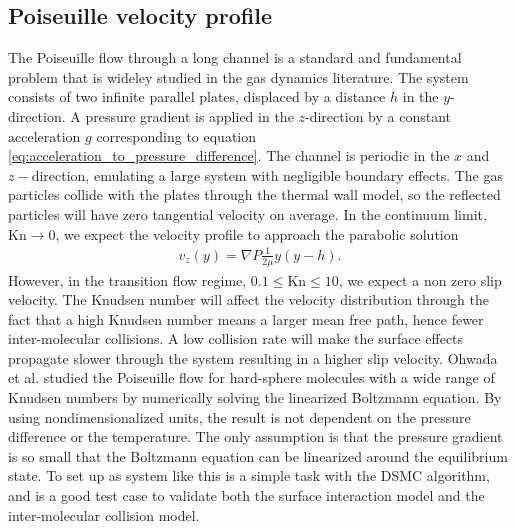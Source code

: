 \subsection{Poiseuille velocity profile}
\label{sec:dsmc_validation_poiseuille}
The Poiseuille flow through a long channel is a standard and fundamental problem that is wideley studied in the gas dynamics literature. The system consists of two infinite parallel plates, displaced by a distance $h$ in the $y$-direction. A pressure gradient is applied in the $z$-direction by a constant acceleration $g$ corresponding to equation \ref{eq:acceleration_to_pressure_difference}. The channel is periodic in the $x$ and $z-$direction, emulating a large system with negligible boundary effects. The gas particles collide with the plates through the thermal wall model, so the reflected particles will have zero tangential velocity on average. In the continuum limit, $\text{Kn}\rightarrow 0$, we expect the velocity profile to approach the parabolic solution \cite{batchelor2000introduction}
\begin{align}
	v_z(y) = \nabla P\frac{1}{2\mu}y(y-h).
\end{align}
However, in the transition flow regime, $0.1 \leq \text{Kn} \leq 10$, we expect a non zero slip velocity\cite{morris1992slip}. The Knudsen number will affect the velocity distribution through the fact that a high Knudsen number means a larger mean free path, hence fewer inter-molecular collisions. A low collision rate will make the surface effects propagate slower through the system resulting in a higher slip velocity. Ohwada et al. \cite{ohwada1989numerical} studied the Poiseuille flow for hard-sphere molecules with a wide range of Knudsen numbers by numerically solving the linearized Boltzmann equation. By using nondimensionalized units, the result is not dependent on the pressure difference or the temperature. The only assumption is that the pressure gradient is so small that the Boltzmann equation can be linearized around the equilibrium state. To set up as system like this is a simple task with the DSMC algorithm, and is a good test case to validate both the surface interaction model and the inter-molecular collision model.

